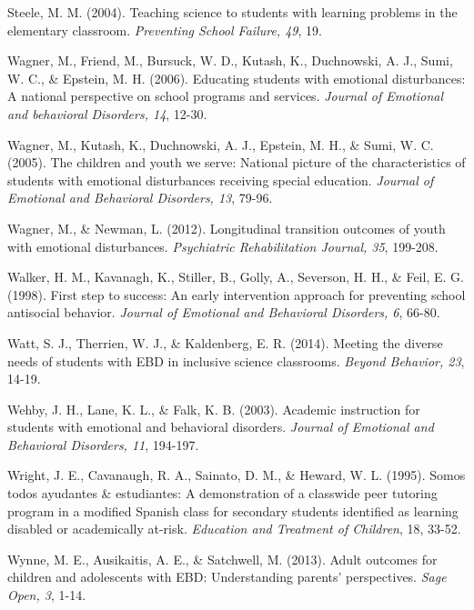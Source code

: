 \documentclass[11.5pt]{sig-alternate} %
\begin{document}
Steele, M. M. (2004). Teaching science to students with learning problems in the elementary classroom. \textit{Preventing School Failure, 49}, 19.

Wagner, M., Friend, M., Bursuck, W. D., Kutash, K., Duchnowski, A. J., Sumi, W. C., \& Epstein, M. H. (2006). Educating students with emotional disturbances: A national perspective on school programs and services. \textit{Journal of Emotional and behavioral Disorders, 14}, 12-30.

Wagner, M., Kutash, K., Duchnowski, A. J., Epstein, M. H., \& Sumi, W. C. (2005). The children and youth we serve: National picture of the characteristics of students with emotional disturbances receiving special education. \textit{Journal of Emotional and Behavioral Disorders, 13}, 79-96.

Wagner, M., \& Newman, L. (2012). Longitudinal transition outcomes of youth with emotional disturbances. \textit{Psychiatric Rehabilitation Journal, 35}, 199-208. 

Walker, H. M., Kavanagh, K., Stiller, B., Golly, A., Severson, H. H., \& Feil, E. G. (1998). First step to success: An early intervention approach for preventing school antisocial behavior. \textit{Journal of Emotional and Behavioral Disorders, 6}, 66-80.

Watt, S. J., Therrien, W. J., \& Kaldenberg, E. R. (2014). Meeting the diverse needs of students with EBD in inclusive science classrooms. \textit{Beyond Behavior, 23}, 14-19. 

Wehby, J. H., Lane, K. L., \& Falk, K. B. (2003). Academic instruction for students with emotional and behavioral disorders. \textit{Journal of Emotional and Behavioral Disorders, 11}, 194-197.

Wright, J. E., Cavanaugh, R. A., Sainato, D. M., \& Heward, W. L. (1995). Somos todos ayudantes \& estudiantes: A demonstration of a classwide peer tutoring program in a modified Spanish class for secondary students identified as learning disabled or academically at-risk. \textit{Education and Treatment of Children}, 18, 33-52.	

Wynne, M. E., Ausikaitis, A. E., \& Satchwell, M. (2013). Adult outcomes for children and adolescents with EBD: Understanding parents’ perspectives. \textit{Sage Open, 3}, 1-14.
\end{document}
